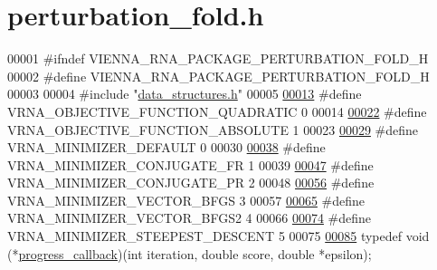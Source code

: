 \hypertarget{perturbation__fold_8h_source}{}\section{perturbation\+\_\+fold.\+h}
\label{perturbation__fold_8h_source}

\begin{DoxyCode}
00001 \textcolor{preprocessor}{#ifndef VIENNA\_RNA\_PACKAGE\_PERTURBATION\_FOLD\_H}
00002 \textcolor{preprocessor}{#define VIENNA\_RNA\_PACKAGE\_PERTURBATION\_FOLD\_H}
00003 
00004 \textcolor{preprocessor}{#include "\hyperlink{data__structures_8h}{data\_structures.h}"}
00005 
\hypertarget{perturbation__fold_8h_source_l00013}{}\hyperlink{group__soft__constraints_ga81e10993d1ae728e4e02022b33155a12}{00013} \textcolor{preprocessor}{#define VRNA\_OBJECTIVE\_FUNCTION\_QUADRATIC 0}
00014 
\hypertarget{perturbation__fold_8h_source_l00022}{}\hyperlink{group__soft__constraints_gac070dfb9cafaeb14d5652bd9adf0f6b1}{00022} \textcolor{preprocessor}{#define VRNA\_OBJECTIVE\_FUNCTION\_ABSOLUTE 1}
00023 
\hypertarget{perturbation__fold_8h_source_l00029}{}\hyperlink{group__soft__constraints_gae5126200d80dbb282f46083fffc606bf}{00029} \textcolor{preprocessor}{#define VRNA\_MINIMIZER\_DEFAULT 0}
00030 
\hypertarget{perturbation__fold_8h_source_l00038}{}\hyperlink{group__soft__constraints_gab1d89db58e8c497795a5005f5dbc8c4a}{00038} \textcolor{preprocessor}{#define VRNA\_MINIMIZER\_CONJUGATE\_FR 1}
00039 
\hypertarget{perturbation__fold_8h_source_l00047}{}\hyperlink{group__soft__constraints_ga5aaeafe1b0aa77a5cda18943ff94b02f}{00047} \textcolor{preprocessor}{#define VRNA\_MINIMIZER\_CONJUGATE\_PR 2}
00048 
\hypertarget{perturbation__fold_8h_source_l00056}{}\hyperlink{group__soft__constraints_ga9be8a702cddf58235571ace11cc41b22}{00056} \textcolor{preprocessor}{#define VRNA\_MINIMIZER\_VECTOR\_BFGS 3}
00057 
\hypertarget{perturbation__fold_8h_source_l00065}{}\hyperlink{group__soft__constraints_ga7b0a65c6c92fa1d8012383ba9d3dcb4f}{00065} \textcolor{preprocessor}{#define VRNA\_MINIMIZER\_VECTOR\_BFGS2 4}
00066 
\hypertarget{perturbation__fold_8h_source_l00074}{}\hyperlink{group__soft__constraints_ga9ecd2144c2ebed7533233da3986521b0}{00074} \textcolor{preprocessor}{#define VRNA\_MINIMIZER\_STEEPEST\_DESCENT 5}
00075 
\hypertarget{perturbation__fold_8h_source_l00085}{}\hyperlink{group__soft__constraints_gaa715397c7afd2d2955c315512a3d571a}{00085} \textcolor{keyword}{typedef} void (*\hyperlink{group__soft__constraints_gaa715397c7afd2d2955c315512a3d571a}{progress\_callback})(\textcolor{keywordtype}{int} iteration, \textcolor{keywordtype}{double} score, \textcolor{keywordtype}{double} *epsilon);

\end{DoxyCode}
